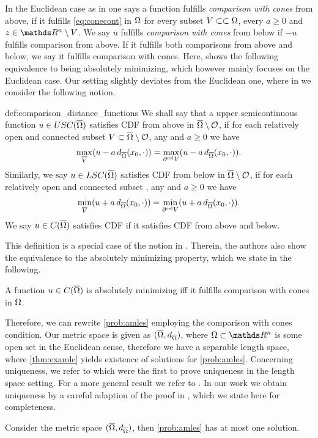 %
%
In the Euclidean case as in \cite{aronsson2004tour} one says a function fulfills \emph{comparison with cones} from above, if it fulfills \cref{eq:conecont} in $\Omega$ for every subset $V\subset\subset\Omega$, every $a\geq 0$ and $z\in\R^n\setminus V$. We say $u$ fulfills \emph{comparison with cones} from below if $-u$ fulfills comparison from above. If it fulfills both comparisons from above and below, we say it fulfills comparison with cones. Here, \cite[Prop. 2.1]{aronsson2004tour} shows the following equivalence to being absolutely minimizing, which however mainly focuses on the Euclidean case. Our setting slightly deviates from the Euclidean one, where in \cite{bungert2021uniform} we consider the following notion.
%
\begin{definition}{\cite[Def. 4.1]{bungert2021uniform}}{def:comparison_distance_functions}
We shall say that a upper semicontinuous function $u\in USC(\overline{\Omega})$ satisfies CDF from above in $\overline{\Omega}\setminus\mathcal{O}$, if  for each relatively open and connected subset $V \subset \overline{\Omega}\setminus\mathcal{O}$, any  and $a\geq 0$ we have
\[\max_{\overline{V}}(u - a\,d_{\overline{\Omega}}(x_0,\cdot)) = \max_{\partial^\text{rel} V}(u - a\,d_{\overline{\Omega}}(x_0,\cdot)).\]
Similarly, we say  $u\in LSC(\overline{\Omega})$ satisfies CDF from below in $\overline{\Omega}\setminus\mathcal{O}$, if for each relatively open and connected subset , any  and $a\geq 0$ we have
\[\min_{\overline{V}}(u + a\,d_{\overline{\Omega}}(x_0,\cdot)) = \min_{\partial^\text{rel} V}(u + a\,d_{\overline{\Omega}}(x_0,\cdot)).\]
We say $u\in C(\overline{\Omega})$ satisfies CDF if it satisfies CDF from above and below.
\end{definition}
%
\noindent%
This definition is a special case of the notion in \cite{juutinen2006equivalence}. Therein, the authors also show the equivalence to the absolutely minimizing property, which we state in the following.
%
%
\begin{theorem}{\cite[Prop. 4.1]{juutinen2006equivalence}}{}
A function $u\in C(\overline{\Omega})$ is absolutely minimizing iff it fulfills comparison with cones in $\Omega$.
\end{theorem}
%
\noindent%
Therefore, we can rewrite \cref{prob:amles} employing the comparison with cones condition. Our metric space is given as $(\overline{\Omega}, d_{\overline{\Omega}})$, where $\domain\subset\R^n$ is some open set in the Euclidean sense, therefore we have a separable length space, where \cref{thm:examle} yields existence of solutions for \cref{prob:amles}. Concerning uniqueness, we refer to \cite{peres2009tug} which were the first to prove uniqueness in the length space setting. For a more general result we refer to \cite{naor2012absolutely}. In our work we obtain uniqueness by a careful adaption of the proof in \cite{armstrong2010easy}, which we state here for completeness.
%
\begin{proposition}{\cite[Prop. 4.11]{bungert2021uniform}}{}
Consider the metric space $(\overline{\Omega}, d_{\overline{\Omega}})$, then \cref{prob:amles} has at most one solution.
\end{proposition}
%
%
